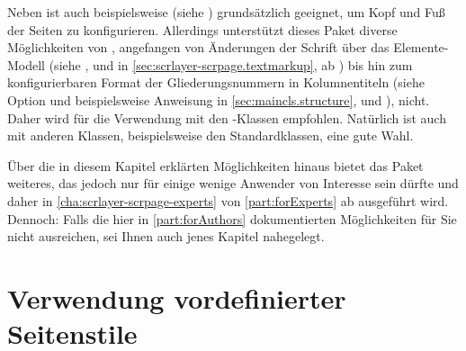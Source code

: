 Neben  ist auch beispielsweise
%
 (siehe \cite{package:fancyhdr})
grundsätzlich geeignet, um Kopf und Fuß der Seiten zu
konfigurieren. Allerdings unterstützt dieses Paket diverse
Möglichkeiten von \KOMAScript{}, angefangen von Änderungen der Schrift über
das Elemente-Modell (siehe ,
 und
 in
\autoref{sec:scrlayer-scrpage.textmarkup}, ab
) bis hin zum konfigurierbaren Format
der Gliederungsnummern in Kolumnentiteln (siehe Option
 und beispielsweise Anweisung
 in \autoref{sec:maincls.structure},
 und
),
nicht. Daher wird für die Verwendung mit den
\KOMAScript-Klassen  empfohlen. Natürlich ist
 auch mit anderen Klassen, beispielsweise den
Standardklassen, eine gute Wahl.

Über die in diesem Kapitel erklärten Möglichkeiten hinaus bietet das Paket
 weiteres, das jedoch nur für einige wenige
Anwender von Interesse sein dürfte und daher in
\autoref{cha:scrlayer-scrpage-experts} von \autoref{part:forExperts} ab
 ausgeführt wird. Dennoch: Falls die
hier in \autoref{part:forAuthors} dokumentierten Möglichkeiten für Sie nicht
ausreichen, sei Ihnen auch jenes Kapitel nahegelegt.




\section{Verwendung vordefinierter Seitenstile}

